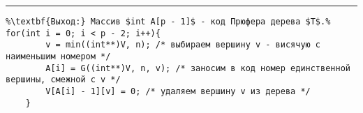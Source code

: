\vspace{5pt} \hrule
\begin{lstlisting}[caption={Построение кода Прюфера свободного дерева}, label=p_303, escapechar=\%]
%\noindent\textbf{Вход:}. Дерево $T(V,E)$ в любом представлении, вершины дерева занумерованы числами $1..p$ произвольным образом\\%
%\textbf{Выход:} Массив $int A[p - 1]$ - код Прюфера дерева $T$.%
for(int i = 0; i < p - 2; i++){
		v = min((int**)V, n); /* выбираем вершину v - висячую с наименьшим номером */
		A[i] = G((int**)V, n, v); /* заносим в код номер единственной вершины, смежной с v */
		V[A[i] - 1][v] = 0; /* удаляем вершину v из дерева */
	}
\end{lstlisting}
